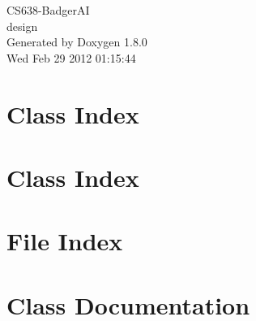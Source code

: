 \documentclass{book}
\begin{document}
\hypersetup{pageanchor=false,citecolor=blue}
\begin{titlepage}
\vspace*{7cm}
\begin{center}
{\Large C\-S638-\/\-Badger\-A\-I \\[1ex]\large design }\\
\vspace*{1cm}
{\large Generated by Doxygen 1.8.0}\\
\vspace*{0.5cm}
{\small Wed Feb 29 2012 01:15:44}\\
\end{center}
\end{titlepage}
\clearemptydoublepage
{}
\tableofcontents
\clearemptydoublepage
{}
\hypersetup{pageanchor=true,citecolor=blue}
\chapter{Class Index}

\chapter{Class Index}

\chapter{File Index}

\chapter{Class Documentation}



























\end{document}
